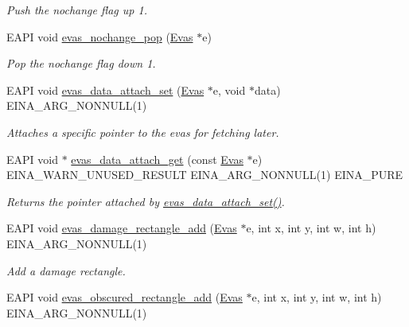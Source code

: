\begin{DoxyCompactItemize}
\begin{DoxyCompactList}\small\item\em Push the nochange flag up 1. \item\end{DoxyCompactList}\item 
EAPI void \hyperlink{group__Evas__Canvas_gaa001b49fa2aa654ba0b116c6667b0fac}{evas\_\-nochange\_\-pop} (\hyperlink{group__Evas__Canvas_ga5ff87cc4ce6bc43e3b640a6d37f73043}{Evas} $\ast$e)
\begin{DoxyCompactList}\small\item\em Pop the nochange flag down 1. \item\end{DoxyCompactList}\item 
EAPI void \hyperlink{group__Evas__Canvas_gadbf3e81c6db5396d3c6415f3cd34e8c8}{evas\_\-data\_\-attach\_\-set} (\hyperlink{group__Evas__Canvas_ga5ff87cc4ce6bc43e3b640a6d37f73043}{Evas} $\ast$e, void $\ast$data) EINA\_\-ARG\_\-NONNULL(1)
\begin{DoxyCompactList}\small\item\em Attaches a specific pointer to the evas for fetching later. \item\end{DoxyCompactList}\item 
EAPI void $\ast$ \hyperlink{group__Evas__Canvas_ga4244b77b68937ab060bc7d8c3bf77fdc}{evas\_\-data\_\-attach\_\-get} (const \hyperlink{group__Evas__Canvas_ga5ff87cc4ce6bc43e3b640a6d37f73043}{Evas} $\ast$e) EINA\_\-WARN\_\-UNUSED\_\-RESULT EINA\_\-ARG\_\-NONNULL(1) EINA\_\-PURE
\begin{DoxyCompactList}\small\item\em Returns the pointer attached by \hyperlink{group__Evas__Canvas_gadbf3e81c6db5396d3c6415f3cd34e8c8}{evas\_\-data\_\-attach\_\-set()}. \item\end{DoxyCompactList}\item 
EAPI void \hyperlink{group__Evas__Canvas_ga91b68cf4090201f16aede8e4c124986d}{evas\_\-damage\_\-rectangle\_\-add} (\hyperlink{group__Evas__Canvas_ga5ff87cc4ce6bc43e3b640a6d37f73043}{Evas} $\ast$e, int x, int y, int w, int h) EINA\_\-ARG\_\-NONNULL(1)
\begin{DoxyCompactList}\small\item\em Add a damage rectangle. \item\end{DoxyCompactList}\item 
EAPI void \hyperlink{group__Evas__Canvas_gab731e13487e7a2bf6c39d1c1dc69ccc4}{evas\_\-obscured\_\-rectangle\_\-add} (\hyperlink{group__Evas__Canvas_ga5ff87cc4ce6bc43e3b640a6d37f73043}{Evas} $\ast$e, int x, int y, int w, int h) EINA\_\-ARG\_\-NONNULL(1)

\end{DoxyCompactItemize}
